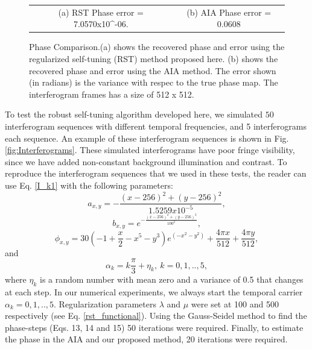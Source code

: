 \documentclass[letterpaper,12pt]{article}   %
\begin{document}
\begin{figure}[ t]
\begin{center}
\begin{tabular}{c c}
			(a) RST Phase error =  7.0570x10^{-06}. & (b) AIA Phase error =  0.0608
		\end{tabular}
	\end{center}
	\caption{Phase Comparison.(a) shows the recovered phase and error using the
	regularized self-tuning (RST) method proposed here. (b)  shows the recovered phase
	and error using the AIA method. The error shown (in radians) is the variance
	with respec to the true phase map. The interferogram frames has a size of 512 x 512.}
	\label{fig:phase}
\end{figure}

To test the robust self-tuning algorithm developed here, we simulated $50$ interferogram
sequences with different temporal frequencies, and 5 interferograms each sequence. An
example of these interferogram sequences is shown in Fig.\ref{fig:Interferograms}. These
simulated interferograms have poor fringe visibility, since we have added non-constant
background illumination and contrast.  To reproduce the interferogram sequences that we
used in these tests, the reader can use Eq. \ref{I_k1} with the following parameters:
\begin{equation}
	a_{x,y}=-\frac{(x-256)^2+(y-256)^2}{1.5259x10^{-5}},
\end{equation}
\begin{equation}
	b_{x,y}=e^{-\frac{(x-256)^2+(y-256)^2}{100^{2}}},
\end{equation}
\begin{equation}
	\phi_{x,y}= 30(-1+\frac{x}{2}-x^5-y^3) e^{(-x^2-y^2)}+\frac{4\pi x}{512}+\frac{4\pi
	 y}{512},
\end{equation}
and
\begin{equation}
	\alpha_k = k\frac{\pi}{3}+\eta_k,\: k=0,1,..,5,
\end{equation}
where $\eta_k$ is a random number with mean zero and a variance of 0.5 that changes at 
each step.
In our numerical experiments, we always start the temporal carrier $\alpha_k=0,1,..,5$.
Regularization parameters $\lambda$ and $\mu$ were set at 100 and 500 respectively (see 
Eq. \ref{rst_functional}). Using the Gauss-Seidel method to find the phase-steps (Eqs. 
13, 14 and 15) 50 iterations  were required. Finally, to estimate the phase in the AIA 
and our proposed method, 20 iterations were required.
\end{document}
